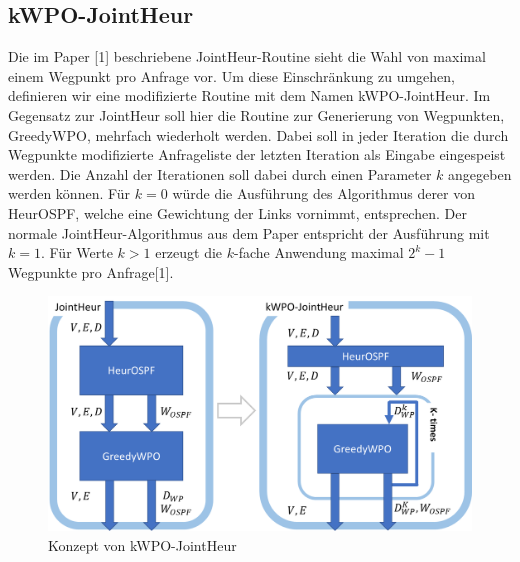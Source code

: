 \documentclass[sigconf,noacm,review]{acmart}
\begin{document}
\subsection{kWPO-JointHeur}
Die im Paper [1] beschriebene JointHeur-Routine sieht die Wahl von maximal einem Wegpunkt pro Anfrage vor. Um diese Einschränkung zu umgehen, definieren wir eine modifizierte Routine mit dem Namen kWPO-JointHeur. Im Gegensatz zur JointHeur soll hier die Routine zur Generierung von Wegpunkten, GreedyWPO, mehrfach wiederholt werden. Dabei soll in jeder Iteration die durch Wegpunkte modifizierte Anfrageliste der letzten Iteration als Eingabe eingespeist werden. 
Die Anzahl der Iterationen soll dabei durch einen Parameter $k$ angegeben werden können. Für $k = 0$ würde die Ausführung des Algorithmus derer von HeurOSPF, welche eine Gewichtung der Links vornimmt, entsprechen. Der normale JointHeur-Algorithmus aus dem Paper entspricht der Ausführung mit $k=1$. Für Werte $k > 1$ erzeugt die $k$-fache Anwendung maximal $2^{k}-1$ Wegpunkte pro Anfrage[1]. \\
\begin{figure}[h]
  \centering 
  \includegraphics[width=\linewidth]{abbildungen/kWPO_Concept.png}
  \caption{Konzept von kWPO-JointHeur}
\end{figure}
\end{document}
